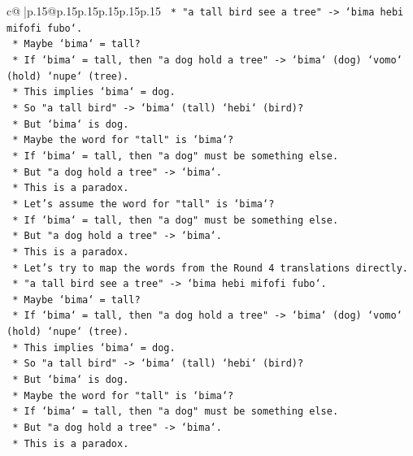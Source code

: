 \documentclass{article}
\begin{document}
{\begin{supertabular}{c@{$\;$}|p{.15\linewidth}@{}p{.15\linewidth}p{.15\linewidth}p{.15\linewidth}p{.15\linewidth}p{.15\linewidth}}
{{{\texttt{        *   "a tall bird see a tree" {-}> `bima hebi mifofi fubo`.} \\
\texttt{        *   Maybe `bima` = tall?} \\
\texttt{        *   If `bima` = tall, then "a dog hold a tree" {-}> `bima` (dog) `vomo` (hold) `nupe` (tree).} \\
\texttt{        *   This implies `bima` = dog.} \\
\texttt{        *   So "a tall bird" {-}> `bima` (tall) `hebi` (bird)?} \\
\texttt{        *   But `bima` is dog.} \\
\texttt{        *   Maybe the word for "tall" is `bima`?} \\
\texttt{        *   If `bima` = tall, then "a dog" must be something else.} \\
\texttt{        *   But "a dog hold a tree" {-}> `bima`.} \\
\texttt{        *   This is a paradox.} \\
\texttt{        *   Let's assume the word for "tall" is `bima`?} \\
\texttt{        *   If `bima` = tall, then "a dog" must be something else.} \\
\texttt{        *   But "a dog hold a tree" {-}> `bima`.} \\
\texttt{        *   This is a paradox.} \\
\texttt{        *   Let's try to map the words from the Round 4 translations directly.} \\
\texttt{        *   "a tall bird see a tree" {-}> `bima hebi mifofi fubo`.} \\
\texttt{        *   Maybe `bima` = tall?} \\
\texttt{        *   If `bima` = tall, then "a dog hold a tree" {-}> `bima` (dog) `vomo` (hold) `nupe` (tree).} \\
\texttt{        *   This implies `bima` = dog.} \\
\texttt{        *   So "a tall bird" {-}> `bima` (tall) `hebi` (bird)?} \\
\texttt{        *   But `bima` is dog.} \\
\texttt{        *   Maybe the word for "tall" is `bima`?} \\
\texttt{        *   If `bima` = tall, then "a dog" must be something else.} \\
\texttt{        *   But "a dog hold a tree" {-}> `bima`.} \\
\texttt{        *   This is a paradox.} \\
}}}
\end{supertabular}}
\end{document}
